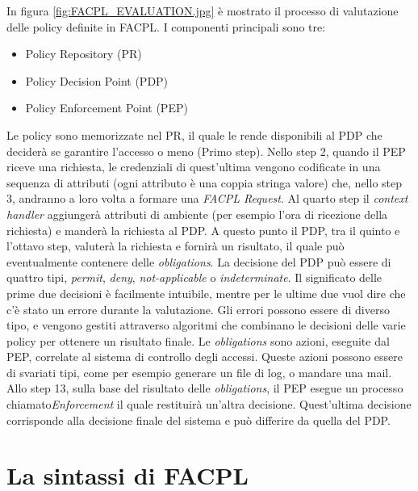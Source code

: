 In figura \ref{fig:FACPL_EVALUATION.jpg} è mostrato il processo di valutazione delle policy definite in FACPL.
I componenti principali sono tre:
\begin{itemize}
\item{Policy Repository (PR)}
\item{Policy Decision Point (PDP)}
\item{Policy Enforcement Point (PEP)}
\end{itemize}
Le policy sono memorizzate nel PR, il quale le rende disponibili al PDP che deciderà se garantire l'accesso o meno (Primo step).
Nello step 2, quando il PEP riceve una richiesta, le credenziali di quest'ultima vengono codificate in una sequenza di attributi (ogni attributo è una coppia stringa valore) che, nello step 3, andranno a loro volta a formare una \textit{FACPL Request}.
Al quarto step il \textit{context handler} aggiungerà attributi di ambiente (per esempio l'ora di ricezione della richiesta) e manderà la richiesta al PDP.
A questo punto il PDP, tra il quinto e l'ottavo step, valuterà la richiesta e fornirà un risultato, il quale può eventualmente contenere delle \textit{obligations}.
La decisione del PDP può essere di quattro tipi, \textit{permit}, \textit{deny}, \textit{not-applicable} o \textit{indeterminate}.
Il significato delle prime due decisioni è facilmente intuibile, mentre per le ultime due vuol dire che c'è stato un errore durante la valutazione.
Gli errori possono essere di diverso tipo, e vengono gestiti attraverso algoritmi che combinano le decisioni delle varie policy per ottenere un risultato finale.
Le \textit{obligations} sono azioni, eseguite dal PEP, correlate al sistema di controllo degli accessi. Queste azioni possono essere di svariati tipi, come per esempio generare un file di log, o mandare una mail.
Allo step 13, sulla base del risultato delle \textit{obligations}, il PEP esegue un processo chiamato\textit{Enforcement} il quale restituirà un'altra decisione.
Quest'ultima decisione corrisponde alla decisione finale del sistema e può differire da quella del PDP.


\section{La sintassi di FACPL}
\label{sec:facpl_syntax}



